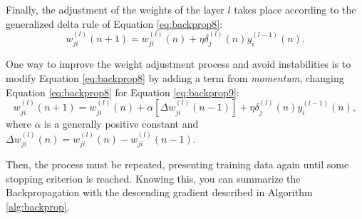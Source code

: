 Finally, the adjustment of the weights of the layer $l$ takes place according to the generalized delta rule of Equation \ref{eq:backprop8}:
\begin{equation}
    \label{eq:backprop8}
    w_{ji}^{(l)} (n+1) = w_{ji}^{(l)}(n) + \eta \delta_j^{(l)}(n) y_i^{(l-1)} (n).
\end{equation}

One way to improve the weight adjustment process and avoid instabilities is to modify Equation \ref{eq:backprop8} by adding a term from \textit{momentum}, changing Equation \ref{eq:backprop8} for Equation \ref{eq:backprop9}:
\begin{equation}
\label{eq:backprop9}
    w_{ji}^{(l)} (n+1) = w_{ji}^{(l)}(n) + \alpha[\Delta w_{ji}^{(l)}(n-1)] + \eta \delta_j^{(l)}(n) y_i^{(l-1)} (n),
\end{equation}
where $\alpha$ is a generally positive constant and $\Delta w_{ji}^{(l)}(n) = w_{ji}^{(l)}(n) - w_{ji}^{(l)}(n-1)$.

Then, the process must be repeated, presenting training data again until some stopping criterion is reached. Knowing this, you can summarize the Backpropagation with the descending gradient described in Algorithm \ref{alg:backprop}.


